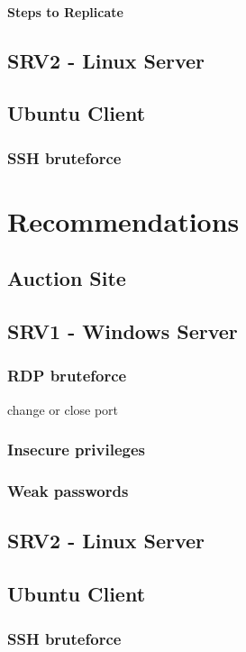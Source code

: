 \documentclass{report}
\begin{document}
\subsubsection{Steps to Replicate}


\section{SRV2 - Linux Server}

\section{Ubuntu Client}
\subsection{SSH bruteforce}

\chapter{Recommendations}
\section{Auction Site}
\section{SRV1 - Windows Server}
\subsection{RDP bruteforce}
	change or close port
\subsection{Insecure privileges}
\subsection{Weak passwords}
\section{SRV2 - Linux Server}
\section{Ubuntu Client}
\subsection{SSH bruteforce}
\end{document}
